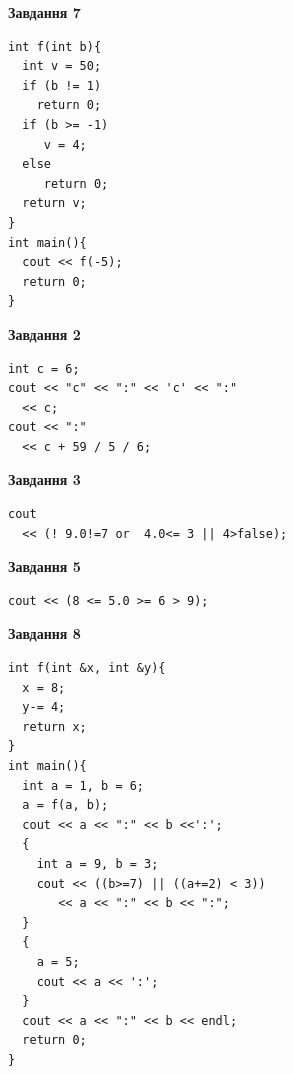 \documentclass[12pt, ukrainian]{article}
\begin{document}
{\begin {large}
\begin{minipage}[t]{7.0cm}
\begin{center}
\textbf{Завдання 7}
\end{center}
\vspace{-8mm}

\begin{verbatim}
int f(int b){
  int v = 50;
  if (b != 1)
    return 0;
  if (b >= -1)
     v = 4;
  else
     return 0;
  return v;
}
int main(){
  cout << f(-5);
  return 0;
}
\end{verbatim}

\end{minipage}
\vline \hspace{1mm}
\begin{minipage}[t]{11.0cm}

\begin{center}
\textbf{Завдання 2}
\end{center}
\vspace{-8mm}

\begin{verbatim}
int c = 6;
cout << "c" << ":" << 'c' << ":" 
  << c;
cout << ":" 
  << c + 59 / 5 / 6;
\end{verbatim}



\begin{center}
\textbf{Завдання 3}
\end{center}
\vspace{-8mm}

\begin{verbatim}
cout 
  << (! 9.0!=7 or  4.0<= 3 || 4>false);
\end{verbatim}



\begin{center}
\textbf{Завдання 5}
\end{center}
\vspace{-8mm}

\begin{verbatim}
cout << (8 <= 5.0 >= 6 > 9);
\end{verbatim}



\begin{center}
\textbf{Завдання 8}
\end{center}
\vspace{-8mm}

\begin{verbatim}
int f(int &x, int &y){
  x = 8;
  y-= 4;
  return x;
}
int main(){
  int a = 1, b = 6;
  a = f(a, b);
  cout << a << ":" << b <<':';
  {
    int a = 9, b = 3;
    cout << ((b>=7) || ((a+=2) < 3))
       << a << ":" << b << ":";
  }
  {
    a = 5;
    cout << a << ':';
  }
  cout << a << ":" << b << endl;
  return 0;
}
\end{verbatim}


\end{minipage}
\end{large}}
\end{document}
